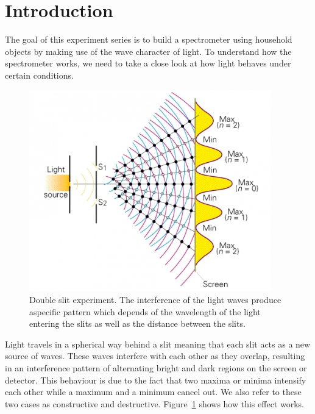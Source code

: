 \section{Introduction}

    

    The goal of this experiment series is to build a spectrometer using household objects by making use of the wave character of light.
    To understand how the spectrometer works, we need to take a close look at how light behaves under certain conditions.

    \begin{figure}[H]
        \centering
        \includegraphics[scale = 0.7]{src/images/interference_double_slit.jpg}
        \caption{Double slit experiment.
        The interference of the light waves produce aspecific pattern which depends of the wavelength of the light entering the slits as well as the distance between the slits. \cite{src_double_slit}}
        \label{fig_double_slit}
    \end{figure}

    Light travels in a spherical way behind a slit meaning that each slit acts as a new source of waves.
    These waves interfere with each other as they overlap, resulting in an interference pattern of alternating bright and dark regions on the screen or detector.
    This behaviour is due to the fact that two maxima or minima intensify each other while a maximum and a minimum cancel out.
    We also refer to these two cases as constructive and destructive.
    Figure~\ref{fig_double_slit} shows how this effect works.

